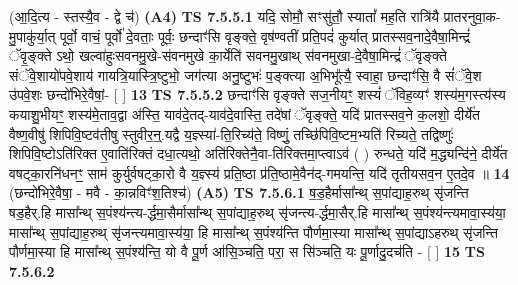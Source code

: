 \documentclass[17pt]{extarticle}
\begin{document}
                  \newline
                      (आ॒दि॒त्य - स्तस्यै॒व - द्वे च॑)  \textbf{(A4)} \newline \newline
                                        \textbf{ TS 7.5.5.1} \newline
                  यदि॒ सोमौ॒ सꣳसु॑तौ॒ स्यातां᳚ मह॒ति रात्रि॑यै प्रातरनुवा॒क-मु॒पाकु॑र्या॒त् पूर्वो॒ वाचं॒ पूर्वो॑ दे॒वताः॒ पूर्वः॒ छन्दाꣳ॑सि वृङ्क्ते॒ वृष॑ण्वतीं प्रति॒पदं॑ कुर्यात् प्रातस्सव॒नादे॒वैषा॒मिन्द्रं॑ ॅवृ॒ङ्क्ते ऽथो॒ खल्वा॑हुःसवनमु॒खे-स॑वनमुखे का॒र्येति॑ सवनमु॒खाथ् स॑वनमुखा-दे॒वैषा॒मिन्द्रं॑ ॅवृङ्क्ते संॅवे॒शायो॑पवे॒शाय॑ गायत्रि॒यास्त्रि॒ष्टुभो॒ जग॑त्या अनु॒ष्टुभः॑ प॒ङ्क्त्या अ॒भिभू᳚त्यै॒ स्वाहा॒ छन्दाꣳ॑सि॒ वै सं॑ॅवे॒श उ॑पवे॒शः छन्दो॑भिरे॒वैषां॒- [  ] \textbf{  13} \newline
                  \newline
                                \textbf{ TS 7.5.5.2} \newline
                  छन्दाꣳ॑सि वृङ्क्ते सज॒नीयꣳ॒॒ शस्यं॑ ॅविह॒व्यꣳ॑ शस्य॑म॒गस्त्य॑स्य कयाशु॒भीयꣳ॒॒ शस्य॑मे॒ताव॒द्वा अ॑स्ति॒ याव॑दे॒तद्-याव॑दे॒वास्ति॒ तदे॑षां ॅवृङ्क्ते॒ यदि॑ प्रातस्सव॒ने क॒लशो॒ दीर्ये॑त वैष्ण॒वीषु॑ शिपिवि॒ष्टव॑तीषु स्तुवीर॒न्॒.यद्वै य॒ज्ञ्स्या॑-ति॒रिच्य॑ते॒ विष्णुं॒ तच्छि॑पिवि॒ष्टम॒भ्यति॑ रिच्यते॒ तद्विष्णुः॑ शिपिवि॒ष्टोऽति॑रिक्त ए॒वाति॑रिक्तं दधा॒त्यथो॒ अति॑रिक्तेनै॒वा-ति॑रिक्तमा॒प्त्वाऽव॑ ( ) रुन्धते॒ यदि॑ म॒द्ध्यन्दि॑ने॒ दीर्ये॑त वषट्का॒रनि॑धनꣳ॒॒ साम॑ कुर्युर्वषट्का॒रो वै य॒ज्ञ्स्य॑ प्रति॒ष्ठा प्र॑ति॒ष्ठामे॒वैन॑द्-गमयन्ति॒ यदि॑ तृतीयसव॒न ए॒तदे॒व ॥ \textbf{  14} \newline
                  \newline
                      (छन्दो॑भिरे॒वैषा॒ - मवै - का॒न्नविꣳ॑श॒तिश्च॑)  \textbf{(A5)} \newline \newline
                                        \textbf{ TS 7.5.6.1} \newline
                  ष॒ड॒हैर्मासा᳚न्थ् स॒पांद्याह॒रुथ् सृ॑जन्ति षड॒हैर्.हि मासा᳚न्थ् स॒पंश्य॑न्त्य-र्द्धमा॒सैर्मासा᳚न्थ् स॒पांद्याह॒रुथ् सृ॑जन्त्य-र्द्धमा॒सैर्.हि मासा᳚न्थ् स॒पंश्य॑न्त्यमावा॒स्य॑या॒ मासा᳚न्थ् स॒पांद्याह॒रुथ् सृ॑जन्त्यमावा॒स्य॑या॒ हि मासा᳚न्थ् स॒पंश्य॑न्ति पौर्णमा॒स्या मासा᳚न्थ् स॒पांद्याऽहरुथ् सृ॑जन्ति पौर्णमा॒स्या हि मासा᳚न्थ् स॒पंश्य॑न्ति॒ यो वै पू॒र्ण आ॑सि॒ञ्चति॒ परा॒ स सि॑ञ्चति॒ यः पू॒र्णादु॒दच॑ति - [  ] \textbf{  15} \newline
                  \newline
                                \textbf{ TS 7.5.6.2} \newline
\end{document}
